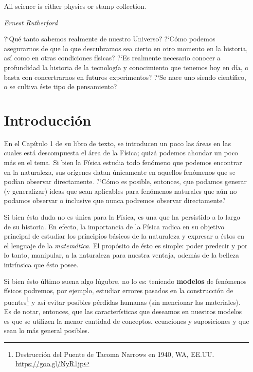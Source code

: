 %

\epigraph{All science is either physics or stamp collection.}{\textit{Ernest Rutherford}}

?`Qu\'e tanto sabemos realmente de nuestro Universo? ?`C\'omo podemos asegurarnos de que lo que descubramos sea cierto en otro momento en la historia, as\'i como en otras condiciones f\'isicas? ?`Es realmente necesario conocer a profundidad la historia de la tecnolog\'ia y conocimiento que tenemos hoy en d\'ia, o basta con concertrarnos en futuros experimentos? ?`Se nace uno siendo cient\'ifico, o se cultiva \'este tipo de pensamiento?

\section{Introducci\'on}\label{sec:intro1}

En el Cap\'itulo 1 de su libro de texto, se introducen un poco las \'areas en las cuales est\'a descompuesta el \'area de la F\'isica; quiz\'a podemos ahondar un poco m\'as en el tema. Si bien la F\'isica estudia todo fen\'omeno que podemos encontrar en la naturaleza, sus or\'igenes datan \'unicamente en aquellos fen\'omenos que se pod\'ian observar directamente. ?`C\'omo es posible, entonces, que podamos generar (y generalizar) ideas que sean aplicables para fen\'omenos naturales que a\'un no podamos observar o inclusive que nunca podremos observar directamente?

Si bien \'esta duda no es \'unica para la F\'isica, es una que ha persistido a lo largo de su historia. En efecto, la importancia de la F\'isica radica en su objetivo principal de estudiar los principios b\'asicos de la naturaleza y expresar a \'estos en el lenguaje de la \textit{matem\'atica}. El prop\'osito de \'esto es simple: poder predecir y por lo tanto, manipular, a la naturaleza para nuestra ventaja, adem\'as de la belleza intr\'insica que \'esto posee.

Si bien \'esto \'ultimo suena algo l\'ugubre, no lo es: teniendo \textbf{modelos} de fen\'omenos f\'isicos podremos, por ejemplo, estudiar errores pasados en la construcci\'on de puentes\footnote{Destrucci\'on del Puente de Tacoma Narrows en 1940, WA, EE.UU. \href{https://goo.gl/NyR1jp}{https://goo.gl/NyR1jp}} y as\'i evitar posibles p\'erdidas humanas (sin mencionar las materiales). Es de notar, entonces, que las caracter\'isticas que deseamos en nuestros modelos es que se utilizen la menor cantidad de conceptos, ecuaciones y suposiciones y que sean lo m\'as general posibles.

